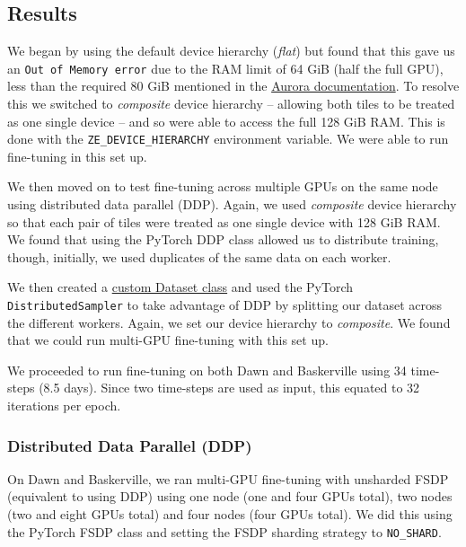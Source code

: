 \subsection{Results}

We began by using the default device hierarchy (\textit{flat}) but found that this gave us an \texttt{Out of Memory error} due to the RAM limit of 64 GiB (half the full GPU), less than the required 80 GiB mentioned in the \href{https://microsoft.github.io/aurora/finetuning.html#computing-gradients}{Aurora documentation}. To resolve this we switched to \textit{composite} device hierarchy -- allowing both tiles to be treated as one single device -- and so were able to access the full 128 GiB RAM. This is done with the \texttt{ZE\_DEVICE\_HIERARCHY} environment variable. We were able to run fine-tuning in this set up.

We then moved on to test fine-tuning across multiple GPUs on the same node using distributed data parallel (DDP). Again, we used \textit{composite} device hierarchy so that each pair of tiles were treated as one single device with 128 GiB RAM. We found that using the PyTorch DDP class allowed us to distribute training, though, initially, we used duplicates of the same data on each worker.

We then created a \href{https://docs.pytorch.org/tutorials/beginner/basics/data_tutorial.html#creating-a-custom-dataset-for-your-files}{custom Dataset class} and used the PyTorch {\tt DistributedSampler} to take advantage of DDP by splitting our dataset across the different workers. Again, we set our device hierarchy to \textit{composite}. We found that we could run multi-GPU fine-tuning with this set up.

We proceeded to run fine-tuning on both Dawn and Baskerville using 34 time-steps (8.5 days). Since two time-steps are used as input, this equated to 32 iterations per epoch.

\subsubsection{Distributed Data Parallel (DDP)}
\label{section:time-comparison}

On Dawn and Baskerville, we ran multi-GPU fine-tuning with unsharded FSDP (equivalent to using DDP) using one node (one and four GPUs total), two nodes (two and eight GPUs total) and four nodes (four GPUs total). We did this using the PyTorch FSDP class and setting the FSDP sharding strategy to \texttt{NO\_SHARD}.

